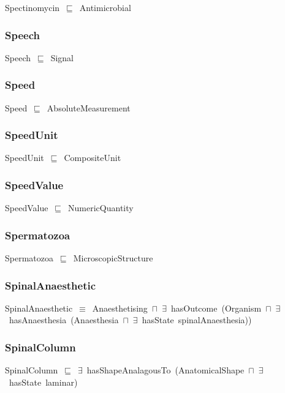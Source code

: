 \documentclass{article}
\begin{document}
Spectinomycin~\ensuremath{\sqsubseteq}~Antimicrobial~

\subsubsection*{Speech}

Speech~\ensuremath{\sqsubseteq}~Signal~

\subsubsection*{Speed}

Speed~\ensuremath{\sqsubseteq}~AbsoluteMeasurement~

\subsubsection*{SpeedUnit}

SpeedUnit~\ensuremath{\sqsubseteq}~CompositeUnit~

\subsubsection*{SpeedValue}

SpeedValue~\ensuremath{\sqsubseteq}~NumericQuantity~

\subsubsection*{Spermatozoa}

Spermatozoa~\ensuremath{\sqsubseteq}~MicroscopicStructure~

\subsubsection*{SpinalAnaesthetic}

SpinalAnaesthetic~\ensuremath{\equiv}~Anaesthetising~\ensuremath{\sqcap}~\ensuremath{\exists}~hasOutcome~(Organism~\ensuremath{\sqcap}~\ensuremath{\exists}~hasAnaesthesia~(Anaesthesia~\ensuremath{\sqcap}~\ensuremath{\exists}~hasState~spinalAnaesthesia))

\subsubsection*{SpinalColumn}

SpinalColumn~\ensuremath{\sqsubseteq}~\ensuremath{\exists}~hasShapeAnalagousTo~(AnatomicalShape~\ensuremath{\sqcap}~\ensuremath{\exists}~hasState~laminar)~
\end{document}
